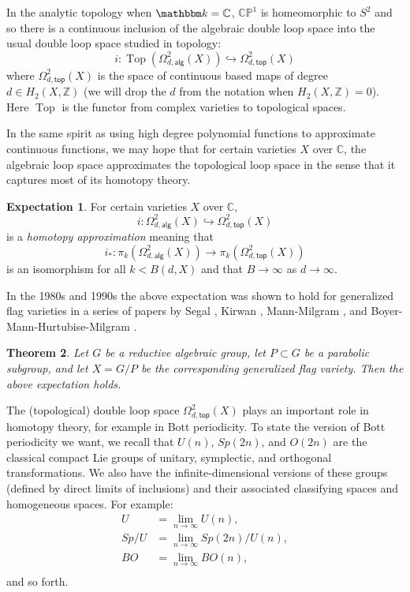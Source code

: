 \message{ !name(Bryan-Vakil.tex)}\documentclass{amsart}
\newtheorem{theorem}{Theorem}[section]
\theoremstyle{definition}
\newtheorem{expectation}[theorem]{Expectation}
\newcommand{\CC} {{\mathbb C}}          %
\newcommand{\ZZ} {{\mathbb Z}}		%
\newcommand{\kk} {{\mathbbm k}}
\newcommand{\PP}{\mathbb{P}}
\newcommand{\alg}{\mathsf{alg}}
\renewcommand{\top}{\mathsf{top}}
\newcommand{\LoopTwo}{\Omega^{2}_{d,\alg}}
\newcommand{\LoopTwoTop}{\Omega^{2}_{d,\top}}
\begin{document}
In the analytic topology when $\kk =\CC$, $\CC \PP^{1}$ is homeomorphic to
$S^{2}$ and so there is a continuous inclusion of the algebraic double loop
space into the usual double loop space studied in topology:
\[
i: \operatorname{Top} \left( \LoopTwo (X) \right) \hookrightarrow \LoopTwoTop (X)
\]
where $\LoopTwoTop (X)$ is the space of continuous based maps of
degree $d\in H_{2}(X,\ZZ )$ (we will drop the $d$ from the notation
when $H_{2}(X,\ZZ )=0$).   Here $\operatorname{Top}$ is the functor from complex varieties to topological spaces.

In the same spirit as using high degree polynomial functions to
approximate continuous functions, we may hope that for certain
varieties $X$ over $\CC$, the algebraic loop space approximates the
topological loop space in the sense that it captures most of its
homotopy theory.

\begin{expectation}
For certain varieties $X$ over $\CC$, 
\[
i:\LoopTwo (X) \hookrightarrow \LoopTwoTop
(X)
\]
is a \emph{homotopy approximation} meaning that 
\[
i_{*}:\pi_{k}(\LoopTwo (X)) \to \pi_{k}( \LoopTwoTop (X))
\]
is an isomorphism for all $k<B(d,X)$ and that $B\to \infty $ as $d\to
\infty$. 
\end{expectation}

In the 1980s and 1990s the above expectation was shown to hold for
generalized flag varieties in a series of papers by Segal \cite{Segal-1979}, Kirwan \cite{Kirwan-1986},
Mann-Milgram \cite{Mann-Millgram-93}, and Boyer-Mann-Hurtubise-Milgram \cite{Boyer-Mann-Hurtubise-Milgram}.

\begin{theorem}\label{thm: Mann-Milgram algebraic loop approximation
holds for generalized flag varieties}
Let $G$ be a reductive algebraic group, let $P\subset G$
be a parabolic subgroup, and let $X=G/P$ be the corresponding
generalized flag variety. Then the above expectation holds.
\end{theorem}

The (topological) double loop space $\LoopTwoTop (X)$ plays an
important role in homotopy theory, for example in Bott periodicity. To
state the version of Bott periodicity we want, we recall that $U(n)$,
$Sp(2n)$, and $O(2n)$ are the classical compact Lie groups of unitary,
symplectic, and orthogonal transformations. We also have the
infinite-dimensional versions of these groups (defined by direct limits of
inclusions) and their associated classifying spaces and homogeneous
spaces. For example:
\begin{align*}
U&=\lim_{n\to  \infty} U(n),\\
Sp/U& = \lim_{n\to  \infty} Sp(2n)/U(n),\\
BO& = \lim_{n\to  \infty} BO(n),\\
\end{align*}
and so forth.
\end{document}
